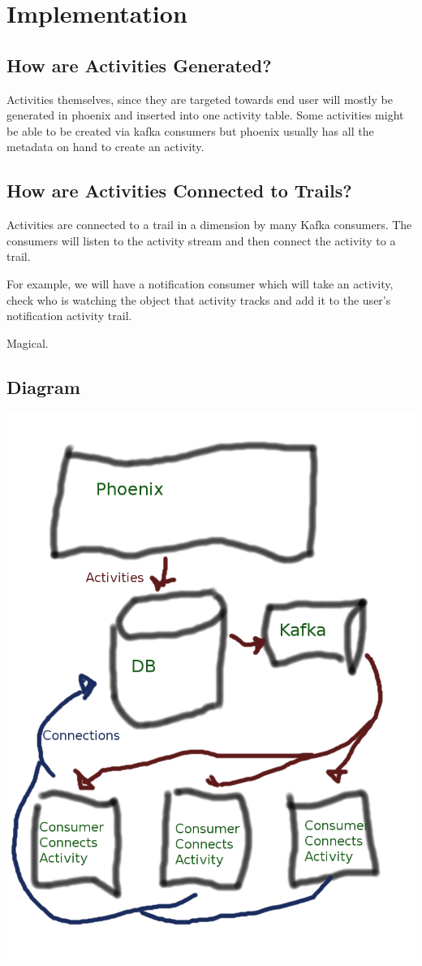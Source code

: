 \documentclass[11pt]{article}
\begin{document}
\section{Implementation}


\subsection{How are Activities Generated?}

Activities themselves, since they are targeted towards end user will mostly be generated
in phoenix and inserted into one activity table. Some activities might be able to 
be created via kafka consumers but phoenix usually has all the metadata on hand
to create an activity.

\subsection{How are Activities Connected to Trails?}

Activities are connected to a trail in a dimension by many Kafka consumers. The consumers
will listen to the activity stream and then connect the activity to a trail.

For example, we will have a notification consumer which will take an activity, check who
is watching the object that activity tracks and add it to the user's notification activity trail.

Magical.

\subsection{Diagram}
\includegraphics[scale=0.40]{implementation}
\newpage
\end{document}
